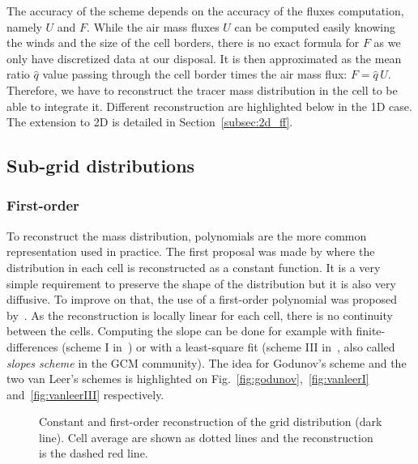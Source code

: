 The accuracy of the scheme depends on the accuracy of the fluxes computation,
namely $U$ and $F$. While the air mass fluxes $U$ can be computed easily knowing
the winds and the size of the cell borders, there is no exact formula for $F$ as
we only have discretized data at our disposal.  It is then approximated as the
mean ratio $\hat{q}$ value passing through the cell border times the air mass
flux: $F=\hat{q}\,U$. Therefore, we have to reconstruct the tracer mass
distribution in the cell to be able to integrate it. Different reconstruction
are highlighted below in the 1D case. The extension to 2D is detailed in
Section~\ref{subsec:2d_ff}.

\subsection{Sub-grid distributions}
\subsubsection{First-order}
To reconstruct the mass distribution, polynomials are the more common
representation used in practice. The first proposal was made by
\cite{Godunov1961} where the distribution in each cell is reconstructed as a
constant function. It is a very simple requirement to preserve the
shape of the distribution but it is also very diffusive. To improve on that, the use
of a first-order polynomial was proposed by~\cite{Leer1977}. As the
reconstruction is locally linear for each cell, there is no continuity between
the cells.  Computing the slope can be done for example with
finite-differences (scheme I in~\cite{Leer1977}) or with a least-square fit
(scheme III in~\cite{Leer1977}, also called \textit{slopes scheme} in the \gls{GCM}
community). The idea for Godunov's scheme and the two van Leer's schemes is
highlighted on Fig.~\ref{fig:godunov},~\ref{fig:vanleerI}
and~\ref{fig:vanleerIII} respectively.
\begin{figure}
  \hfill
  \caption{Constant and first-order reconstruction of the grid distribution
    (dark line). Cell average are shown as dotted lines and the reconstruction is
  the dashed red line.}
\end{figure}


